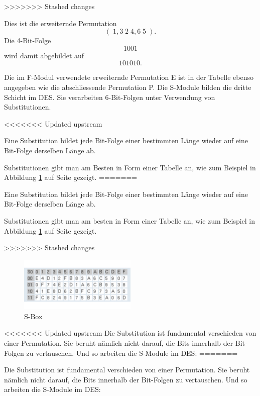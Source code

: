\documentclass[%
<<<<<<< Updated upstream
11pt,%
twoside,%
titlepage,%
german,%
headsepline%
]{scrartcl}
\begin{document}
>>>>>>> Stashed changes
\begin{bsp}
Dies ist die erweiternde Permutation 
$$(\; 1,3\; 2\; 4,6\; 5\; ).$$
Die 4-Bit-Folge
$$1001$$
wird damit abgebildet auf
$$101010.$$
\end{bsp}

Die im F-Modul verwendete erweiternde Permutation E ist in der   Tabelle ebenso angegeben wie die abschliessende Permutation P.
Die S-Module bilden die dritte Schicht im DES. Sie verarbeiten 6-Bit-Folgen unter Verwendung von Substitutionen.

<<<<<<< Updated upstream
\begin{cdef}[Substitution]{}
Eine Substitution bildet jede Bit-Folge einer bestimmten Länge wieder auf eine Bit-Folge derselben Länge ab.
\end{cdef}

Substitutionen gibt man am Besten in Form einer Tabelle an, wie zum Beispiel in Abbildung \ref{abb:subst} auf Seite \pageref{abb:subst} gezeigt.
=======
\begin{cdef}[Substitution]
Eine Substitution bildet jede Bit-Folge einer bestimmten Länge wieder auf eine Bit-Folge derselben Länge ab.
\end{cdef}

Substitutionen gibt man am besten in Form einer Tabelle an, wie zum Beispiel in Abbildung \ref{abb:subst} auf Seite \pageref{abb:subst} gezeigt.

>>>>>>> Stashed changes
\begin{figure}
\begin{center}
\includegraphics[width=0.5\textwidth]{pictures/subst}
\end{center}
\caption{S-Box}\label{abb:subst}
\end{figure}
<<<<<<< Updated upstream
Die Substitution ist fundamental verschieden von einer Permutation. Sie beruht nämlich nicht darauf, die Bits innerhalb der Bit-Folgen zu vertauschen.
Und so arbeiten die S-Module im DES:
=======

Die Substitution ist fundamental verschieden von einer Permutation. Sie beruht nämlich nicht darauf, die Bits innerhalb der Bit-Folgen zu vertauschen.
Und so arbeiten die S-Module im DES:
\end{document}

